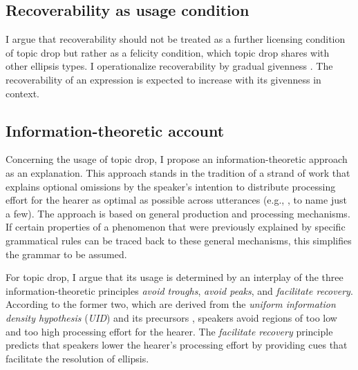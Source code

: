 \subsection{Recoverability as usage condition}
I argue that recoverability should not be treated as a further licensing condition of topic drop but rather as a felicity condition, which topic drop shares with other ellipsis types.
I operationalize recoverability by gradual givenness \citep{ariel1990,chafe1994}.
The recoverability of an expression is expected to increase with its givenness in context.

\subsection{Information-theoretic account} 
Concerning the usage of topic drop, I propose an information\hyp theoretic approach as an explanation.
This approach stands in the tradition of a strand of work that explains optional omissions by the speaker's intention to distribute processing effort  for the hearer as optimal as possible across utterances (e.g., \cite{levy.jaeger2007, jaeger2010, asr.demberg2015, lemke2021}, to name just a few).
The approach is based on general production and processing mechanisms.
If certain properties of a phenomenon that were previously explained by specific grammatical rules can be traced back to these general mechanisms, this simplifies the grammar to be assumed.

For topic drop, I argue that its usage is determined by an interplay of the three information\hyp theoretic principles \textit{avoid troughs}, \textit{avoid peaks}, and \textit{facilitate recovery}. 
According to the former two, which are derived from the \textit{uniform information density hypothesis} (\textit{UID}) \citep{levy.jaeger2007} and its precursors \citep[e.g.,][]{fenk.fenk1980}, speakers avoid regions of too low and too high processing effort for the hearer. 
The \textit{facilitate recovery} principle predicts that speakers lower the hearer's processing effort by providing cues that facilitate the resolution of ellipsis. 

